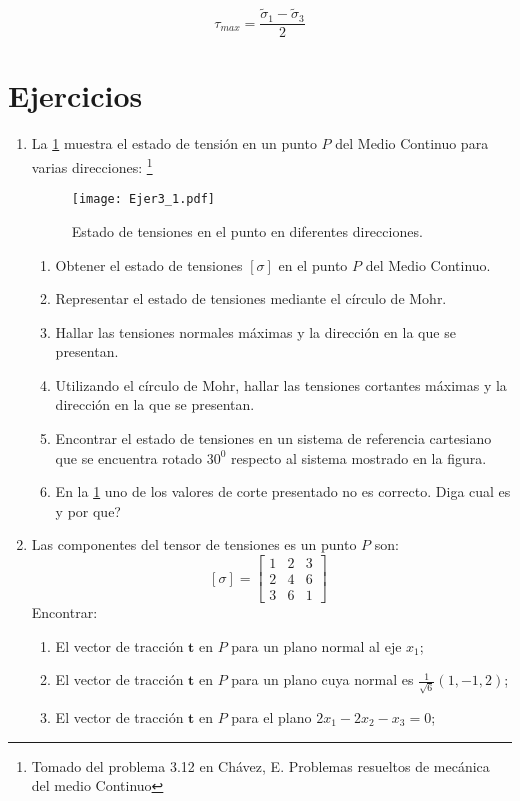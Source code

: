 \documentclass[../notas medios.tex]{subfiles}
\begin{document}
\[\tau_{max} =\frac{{\tilde \sigma }_1 - {\tilde \sigma }_3}{2} \]


\section{Ejercicios}

\begin{enumerate}
\item \label{punto01} La \cref{figura2:mala} muestra el estado de tensión
en un punto $P$ del Medio Continuo para varias direcciones: \footnote{Tomado del problema 3.12 en Chávez, E. Problemas resueltos de mecánica del medio Continuo}

\begin{figure}[H]
	\centering
	\texttt{[image: Ejer3\_1.pdf]}
	\caption{Estado de tensiones en el punto en diferentes direcciones.}
	\label{figura2:mala}
\end{figure}
\begin{enumerate}
	\item Obtener el estado de tensiones $[\sigma]$ en el punto $P$ del Medio
	Continuo.
	\item Representar el estado de tensiones mediante el c\'irculo de Mohr.
	\item Hallar las tensiones normales m\'aximas y la direcci\'on en la que se presentan.
	\item Utilizando el círculo de Mohr, hallar las tensiones cortantes m\'aximas y la direcci\'on en la que se presentan.
	\item Encontrar el estado de tensiones en un sistema de referencia cartesiano que se encuentra rotado $30^{0}$ respecto al sistema mostrado en la figura.
	\item En la  \cref{figura2:mala} uno de los valores de corte presentado no es correcto. \textquestiondown  Diga cual es y por que?
\end{enumerate}

\item \label{punto02} Las componentes del tensor de tensiones es un punto $P$
son:
		\[{[\sigma]} = \left[ \begin{array}{ccc}
		1 & 2 & 3 \\ 
		2 & 4 & 6 \\ 
		3 & 6 & 1
		\end{array}  \right] \enspace\]
%
Encontrar:
%
\begin{enumerate}
	\item El vector de tracci\'on $\mathbf{t}$ en $P$ para un plano normal al eje $x_1$;
	\item El vector de tracci\'on $\mathbf{t}$ en $P$ para un plano cuya normal es $\frac{1}{\sqrt{6}}(1,-1,2)$;
	\item El vector de tracci\'on $\mathbf{t}$ en $P$ para el plano $2x_1 - 2x_2 - x_3 = 0$;
\end{enumerate}


\end{enumerate}
\end{document}
